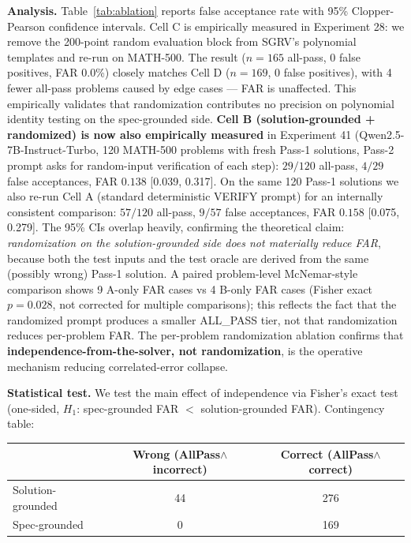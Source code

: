 \documentclass{article}
\begin{document}
\textbf{Analysis.} Table~\ref{tab:ablation} reports false acceptance rate with 95\% Clopper-Pearson confidence intervals. Cell C is empirically measured in Experiment 28: we remove the 200-point random evaluation block from SGRV's polynomial templates and re-run on MATH-500. The result ($n{=}165$ all-pass, 0 false positives, FAR 0.0\%) closely matches Cell D ($n{=}169$, 0 false positives), with 4 fewer all-pass problems caused by edge cases --- FAR is unaffected. This empirically validates that randomization contributes no precision on polynomial identity testing on the spec-grounded side. \textbf{Cell B (solution-grounded + randomized) is now also empirically measured} in Experiment 41 (Qwen2.5-7B-Instruct-Turbo, 120 MATH-500 problems with fresh Pass-1 solutions, Pass-2 prompt asks for random-input verification of each step): $29/120$ all-pass, $4/29$ false acceptances, FAR $0.138$ [0.039, 0.317]. On the same 120 Pass-1 solutions we also re-run Cell A (standard deterministic VERIFY prompt) for an internally consistent comparison: $57/120$ all-pass, $9/57$ false acceptances, FAR $0.158$ [0.075, 0.279]. The 95\% CIs overlap heavily, confirming the theoretical claim: \emph{randomization on the solution-grounded side does not materially reduce FAR}, because both the test inputs and the test oracle are derived from the same (possibly wrong) Pass-1 solution. A paired problem-level McNemar-style comparison shows 9 A-only FAR cases vs 4 B-only FAR cases (Fisher exact $p{=}0.028$, not corrected for multiple comparisons); this reflects the fact that the randomized prompt produces a smaller ALL\_PASS tier, not that randomization reduces per-problem FAR. The per-problem randomization ablation confirms that \textbf{independence-from-the-solver, not randomization}, is the operative mechanism reducing correlated-error collapse.

\textbf{Statistical test.} We test the main effect of independence via Fisher's exact test (one-sided, $H_1$: spec-grounded FAR $<$ solution-grounded FAR). Contingency table:

\begin{center}
\small
\begin{tabular}{lcc}
\toprule
 & Wrong (AllPass$\wedge$incorrect) & Correct (AllPass$\wedge$correct) \\
\midrule
Solution-grounded & 44 & 276 \\
Spec-grounded & 0 & 169 \\
\bottomrule
\end{tabular}
\end{center}
\end{document}
